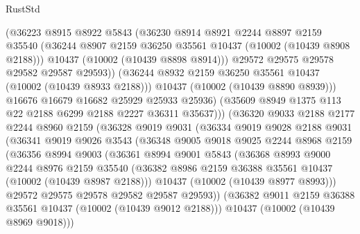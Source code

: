 \begin{lexlean}{RustStd}
\begin{coremodule}
                    (@36223
                      @8915
                      @8922
                      @5843
                      (@36230
                        @8914
                        @8921
                        @2244
                        @8897
                        @2159
                        @35540
                        (@36244 @8907 @2159 @36250 @35561 @10437 (@10002 (@10439 @8908 @2188)))
                        @10437
                        (@10002 (@10439 @8898 @8914)))
                      @29572
                      @29575
                      @29578
                      @29582
                      @29587
                      @29593))
                  (@36244 @8932 @2159 @36250 @35561 @10437 (@10002 (@10439 @8933 @2188)))
                  @10437
                  (@10002 (@10439 @8890 @8939)))
                @16676
                @16679
                @16682
                @25929
                @25933
                @25936)
              (@35609 @8949 @1375 @113 @22 @2188 @6299 @2188 @2227 @36311 @35637)))
          (@36320
            @9033
            @2188
            @2177
            @2244
            @8960
            @2159
            (@36328
              @9019
              @9031
              (@36334
                @9019
                @9028
                @2188
                @9031
                (@36341
                  @9019
                  @9026
                  @3543
                  (@36348
                    @9005
                    @9018
                    @9025
                    @2244
                    @8968
                    @2159
                    (@36356
                      @8994
                      @9003
                      (@36361
                        @8994
                        @9001
                        @5843
                        (@36368
                          @8993
                          @9000
                          @2244
                          @8976
                          @2159
                          @35540
                          (@36382 @8986 @2159 @36388 @35561 @10437 (@10002 (@10439 @8987 @2188)))
                          @10437
                          (@10002 (@10439 @8977 @8993)))
                        @29572
                        @29575
                        @29578
                        @29582
                        @29587
                        @29593))
                    (@36382 @9011 @2159 @36388 @35561 @10437 (@10002 (@10439 @9012 @2188)))
                    @10437
                    (@10002 (@10439 @8969 @9018)))

\end{coremodule}
\end{lexlean}
